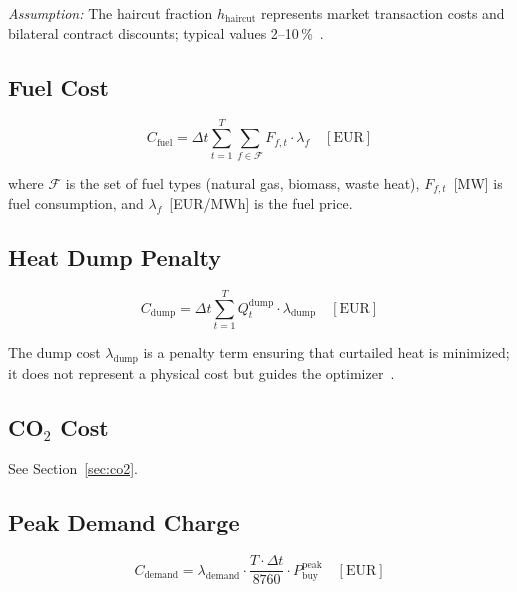 \documentclass[a4paper,12pt]{article}
\begin{document}
\noindent\textit{Assumption:} The haircut fraction $h_{\text{haircut}}$ represents market
transaction costs and bilateral contract discounts; typical values 2–10\,\%~\cite{Kirschen2018}.

\subsection{Fuel Cost}

\begin{equation}
  C_{\text{fuel}}
  = \Delta t \sum_{t=1}^{T} \sum_{f \in \mathcal{F}} F_{f,t} \cdot \lambda_{f}
  \quad [\text{EUR}]
  \label{eq:fuel-cost}
\end{equation}

where $\mathcal{F}$ is the set of fuel types (natural gas, biomass, waste heat),
$F_{f,t}$~[MW] is fuel consumption, and $\lambda_{f}$~[EUR/MWh] is the fuel price.

\subsection{Heat Dump Penalty}

\begin{equation}
  C_{\text{dump}}
  = \Delta t \sum_{t=1}^{T} Q^{\text{dump}}_{t} \cdot \lambda_{\text{dump}}
  \quad [\text{EUR}]
  \label{eq:dump-cost}
\end{equation}

The dump cost $\lambda_{\text{dump}}$ is a penalty term ensuring that curtailed heat is
minimized; it does not represent a physical cost but guides the optimizer~\cite{Pfenninger2014}.

\subsection{CO\texorpdfstring{$_2$}{2} Cost}

See Section~\ref{sec:co2}.

\subsection{Peak Demand Charge}

\begin{equation}
  C_{\text{demand}}
  = \lambda_{\text{demand}} \cdot \frac{T \cdot \Delta t}{8760}
    \cdot P_{\text{buy}}^{\text{peak}}
  \quad [\text{EUR}]
  \label{eq:demand-charge}
\end{equation}
\end{document}
